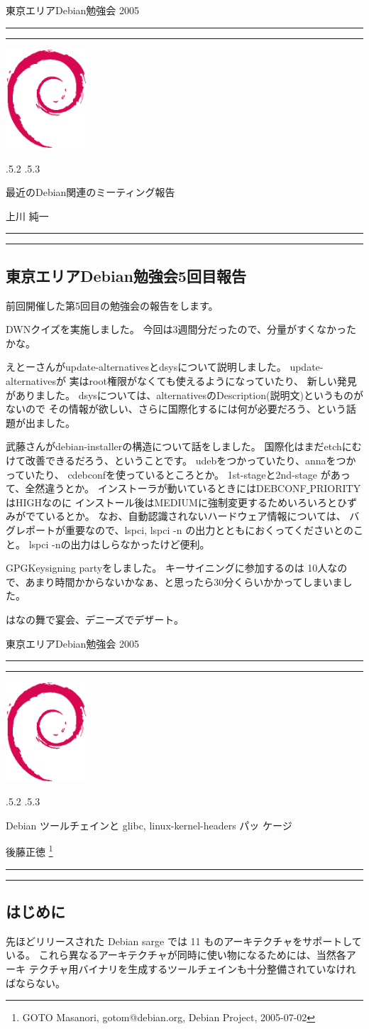 \documentclass[mingoth]{jsarticle}
\makeatletter
\newcounter{santakucounter}
\newcommand{\santaku}[4]{%
\addtocounter{santakucounter}{1}

\nopagebreak 問題\arabic{santakucounter}. 
#1\\
\nopagebreak□ A #2\\
\nopagebreak□ B #3\\
\nopagebreak□ C #4
\pagebreak[1]
\hspace{1cm}
\\

}
\renewcommand{\section}{\@startsection{section}{1}{\z@}%
    {\Cvs \@plus.5\Cdp \@minus.2\Cdp}%
    {.5\Cvs \@plus.3\Cdp}%
    {\normalfont\Large\headfont\raggedright\centering}} %
\newcommand{\dancersection}[2]{%
\newpage
東京エリアDebian勉強会 2005
\hrule
\vspace{0.5mm}
\hrule
\hfill{}\includegraphics[width=3cm]{image200502/openlogo-nd.eps}\\
\vspace{-4cm}
\begin{center}
  \section{#1}
\end{center}
\hfill{}#2\hspace{3cm}\space\\
\hrule
\hrule
\vspace{1cm}
}
\makeatother
\begin{document}

\dancersection{最近のDebian関連のミーティング報告}{上川 純一}

\subsection{東京エリアDebian勉強会5回目報告}


前回開催した第5回目の勉強会の報告をします。

DWNクイズを実施しました。
	    今回は3週間分だったので、分量がすくなかったかな。

えとーさんがupdate-alternativesとdsysについて説明しました。
	    update-alternativesが 実はroot権限がなくても使えるようになっていたり、
	    新しい発見がありました。
	    dsysについては、alternativesのDescription(説明文)というものがないので
	    その情報が欲しい、さらに国際化するには何が必要だろう、という話題が出ました。

	    武藤さんがdebian-installerの構造について話をしました。
	    国際化はまだetchにむけて改善できるだろう、ということです。
	    udebをつかっていたり、annaをつかっていたり、
	    cdebconfを使っているところとか。
	    1st-stageと2nd-stage があって、全然違うとか。
	    インストーラが動いているときにはDEBCONF\underline{ }PRIORITYはHIGHなのに
	    インストール後はMEDIUMに強制変更するためいろいろとひずみがでているとか。
	    なお、自動認識されないハードウェア情報については、
	    バグレポートが重要なので、lspci, lspci -n
	    の出力とともにおくってくださいとのこと。
	    lspci -nの出力はしらなかったけど便利。

	    GPGKeysigning partyをしました。
	    キーサイニングに参加するのは
	    10人なので、あまり時間かからないかなぁ、と思ったら30分くらいかかってしまいました。

はなの舞で宴会、デニーズでデザート。

\dancersection{Debian ツールチェインと glibc, linux-kernel-headers パッ
ケージ}{後藤正徳 \footnote{GOTO Masanori, gotom@debian.org, Debian
Project, 2005-07-02}}
\label{sec:gotom}

\subsection{はじめに}

   先ほどリリースされた Debian sarge では 11 ものアーキテクチャをサポートしている。
   これら異なるアーキテクチャが同時に使い物になるためには、当然各アーキ
   テクチャ用バイナリを生成するツールチェインも十分整備されていなけれ
   ばならない。
\end{document}
